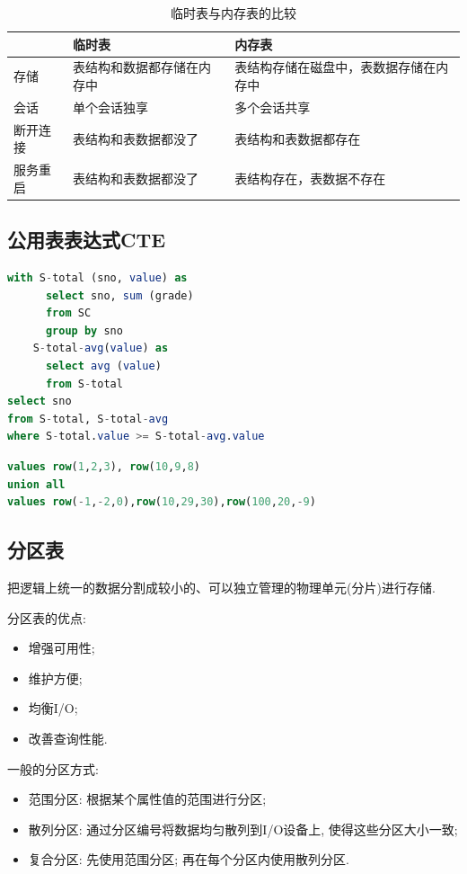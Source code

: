 \begin{table}[H]
\centering
\begin{tabular}{|l|l|l|}
\hline
 & 临时表 & 内存表 \\
\hline
存储 & 表结构和数据都存储在内存中 & 表结构存储在磁盘中，表数据存储在内存中 \\
\hline
会话 & 单个会话独享 & 多个会话共享 \\
\hline
断开连接 & 表结构和表数据都没了 & 表结构和表数据都存在 \\
\hline
服务重启 & 表结构和表数据都没了 & 表结构存在，表数据不存在 \\
\hline
\end{tabular}
\caption{临时表与内存表的比较}
\end{table}

\subsection{公用表表达式CTE}

\begin{lstlisting}[language=SQL]
with S-total (sno, value) as
      select sno, sum (grade)
      from SC
      group by sno
    S-total-avg(value) as
      select avg (value)
      from S-total
select sno
from S-total, S-total-avg
where S-total.value >= S-total-avg.value
\end{lstlisting}

\begin{lstlisting}[language=SQL]
values row(1,2,3), row(10,9,8)
union all
values row(-1,-2,0),row(10,29,30),row(100,20,-9)
\end{lstlisting}

\subsection{分区表}

\begin{definition}[分区表]
  把逻辑上统一的数据分割成较小的、可以独立管理的物理单元(分片)进行存储.
\end{definition}

分区表的优点:
\begin{itemize}
  \item 增强可用性;
  \item 维护方便;
  \item 均衡I/O;
  \item 改善查询性能.
\end{itemize}

一般的分区方式:
\begin{itemize}
  \item 范围分区: 根据某个属性值的范围进行分区;
  \item 散列分区: 通过分区编号将数据均匀散列到I/O设备上, 使得这些分区大小一致;
  \item 复合分区: 先使用范围分区; 再在每个分区内使用散列分区.
\end{itemize}


